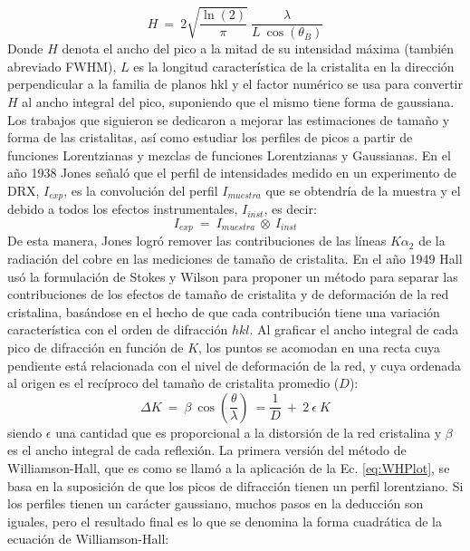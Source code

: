 \begin{equation}
  H \ = \ 2 \sqrt{\frac{\ln(2)}{\pi}} \ \frac{\lambda}{L \ \cos(\theta_B)}
  \label{eq:Scherrer}
\end{equation}
\noindent
Donde $H$ denota el ancho del pico a la mitad de su intensidad máxima (también abreviado FWHM), $L$ es la longitud característica de la cristalita en la dirección perpendicular a la familia de planos {hkl} y el factor numérico se usa para convertir $H$ al ancho integral del pico, suponiendo que el mismo tiene forma de gaussiana.
Los trabajos que siguieron se dedicaron a mejorar las estimaciones de tamaño y forma de las cristalitas, así como estudiar los perfiles de picos a partir de funciones Lorentzianas y mezclas de funciones Lorentzianas y Gaussianas.
En el año 1938 Jones\cite{Jones16} señaló que el perfil de intensidades medido en un experimento de DRX, $I_{exp}$, es la convolución del perfil $I_{muestra}$ que se obtendría de la muestra y el debido a todos los efectos instrumentales, $I_{inst}$, es decir:
\begin{equation}
  I_{exp} \ = \ I_{muestra} \ \otimes \ I_{inst}
  \label{eq:conv}
\end{equation}
\noindent
De esta manera, Jones logró remover las contribuciones de las líneas $K\alpha_2$ de la radiación del cobre en las mediciones de tamaño de cristalita.
En el año 1949 Hall\cite{WHHall1949} usó la formulación de Stokes y Wilson para proponer un método para separar las contribuciones de los efectos de tamaño de cristalita y de deformación de la red cristalina, basándose en el hecho de que cada contribución tiene una variación característica con el orden de difracción ${hkl}$.
Al graficar el ancho integral de cada pico de difracción en función de $K$, los puntos se acomodan en una recta cuya pendiente está relacionada con el nivel de deformación de la red, y cuya ordenada al origen es el recíproco del tamaño de cristalita promedio ($D$):
\begin{equation}
  \Delta K \ = \  \beta \ \cos\left(\frac{\theta}{\lambda}\right) \ = \frac{1}{D} \ + \ 2 \ \epsilon \ K
  \label{eq:WHPlot}
\end{equation}
\noindent
siendo $\epsilon$ una cantidad que es proporcional a la distorsión de la red cristalina y $\beta$ es el ancho integral de cada reflexión.
La primera versión del método de Williamson-Hall, que es como se llamó a la aplicación de la Ec. \ref{eq:WHPlot}, se basa en la suposición de que los picos de difracción tienen un perfil lorentziano.
Si los perfiles tienen un carácter gaussiano, muchos pasos en la deducción son iguales, pero el resultado final es lo que se denomina la forma cuadrática de la ecuación de Williamson-Hall\cite{Scardi2004}:
